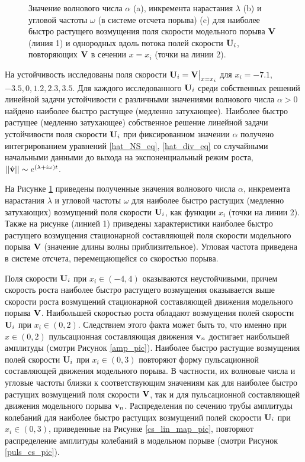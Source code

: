 \begin{figure}
\caption{Значение волнового числа $\alpha$ (a), инкремента нарастания $\lambda$ (b) и угловой частоты $\omega$ (в системе отсчета порыва) (c) для наиболее быстро растущего возмущения поля скорости модельного порыва $\mathbf{V}$ (линия 1) и однородных вдоль потока полей скорости $\mathbf{U}_i$, повторяющих $\mathbf{V}$ в сечении $x = x_i$ (точки на линии 2).}
\label{cs_lin_pic}
\end{figure}

На устойчивость исследованы поля скорости $\mathbf{U}_i = \mathbf{V}\big|_{x=x_i}$ для $x_i = -7.1,$ $-3.5, 0, 1.2, 2.3, 3.5$.  Для каждого исследованного $\mathbf{U}_i$ среди собственных решений линейной задачи устойчивости с различными значениями волнового числа $\alpha >0$ найдено наиболее быстро растущее (медленно затухающее). Наиболее быстро растущее (медленно затухающее) собственное решение линейной задачи устойчивости поля скорости $\mathbf{U}_i$ при фиксированном значении $\alpha$ получено интегрированием уравнений \eqref{hat_NS_eq}, \eqref{hat_div_eq} со случайными начальными данными до выхода на экспоненциальный режим роста, $||\hat {\mathbf{v}}|| \sim e^{(\lambda + i\omega) t}$. 

На Рисунке \ref{cs_lin_pic} приведены полученные значения волнового числа $\alpha$, инкремента нарастания $\lambda$ и угловой частоты $\omega$ для наиболее быстро растущих (медленно затухающих) возмущений поля скорости $\mathbf{U}_i$, как функции $x_i$ (точки на линии 2). Также на рисунке (линией 1) приведены характеристики наиболее быстро растущего возмущения стационарной составляющей поля скорости модельного порыва $\mathbf{V}$ (значение длины волны приблизительное). Угловая частота приведена в системе отсчета, перемещающейся со скоростью порыва. 

Поля скорости $\mathbf{U}_i$ при $x_i \in (-4,4)$ оказываются неустойчивыми, причем скорость роста наиболее быстро растущего возмущения оказывается выше скорости роста возмущений стационарной составляющей движения модельного порыва $\mathbf{V}$. Наибольшей скоростью роста обладают возмущения полей скорости $\mathbf{U}_i$ при $x_i \in (0, 2)$. Следствием этого факта может быть то, что именно при $x \in (0,2)$ пульсационная составляющая движения $\mathbf{v}_n$ достигает наибольшей амплитуды (смотри Рисунок \ref{amp_pic}). Наиболее быстро растущие  возмущения полей скорости $\mathbf{U}_i$ при $x_i \in (0,3)$ повторяют форму пульсационной составляющей движения модельного порыва. В частности, их волновые числа и угловые частоты близки к соответствующим значениям как для наиболее быстро растущих возмущений поля скорости $\mathbf{V}$, так и для пульсационной составляющей движения модельного порыва $\mathbf{v}_n$. Распределения по сечению трубы амплитуды колебаний для наиболее быстро растущих возмущений полей скорости $\mathbf{U}_i$ при $x_i \in (0,3)$, приведенные на Рисунке \ref{cs_lin_map_pic}, повторяют распределение амплитуды колебаний в модельном порыве (смотри Рисунок \ref{puls_cs_pic}).


